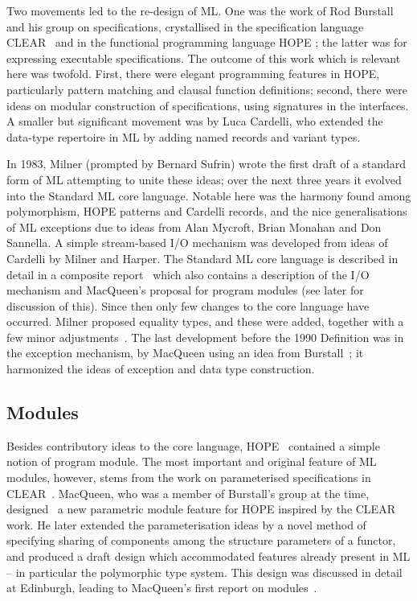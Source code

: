 Two movements led to the re-design of ML.  One was the work of Rod
Burstall and his group on specifications, crystallised in the specification
language CLEAR~\cite{BG} and in the functional programming language HOPE
\cite{BMS};  the latter was for expressing executable specifications.  The
outcome of this work which is relevant here was twofold.  First, there were
elegant programming features in HOPE, particularly pattern matching and
clausal function definitions; second, there were ideas on modular construction
of specifications, using signatures in the interfaces.  A smaller but
significant movement was by Luca Cardelli, who extended the data-type
repertoire in ML by adding named records and variant types.

In 1983, Milner (prompted by Bernard Sufrin) wrote the first draft of a
standard form of ML attempting to unite these ideas; over the next three years
it evolved into the Standard ML core language.  Notable here was the harmony
found among polymorphism, HOPE patterns and Cardelli records, and the nice
generalisations of ML exceptions due to ideas from Alan Mycroft, Brian Monahan
and Don Sannella.  A simple stream-based I/O mechanism was developed from
ideas of Cardelli by Milner and Harper.  The Standard ML core language is
described in detail in a composite report~\cite{HMM} which also contains a
description of the I/O mechanism and MacQueen's proposal for program modules
(see later for discussion of this). Since then only few changes to the core
language have occurred.  Milner proposed equality types, and these were added,
together with a few minor adjustments~\cite{Mil3}.  The
last development before the 1990 Definition was in the exception mechanism, by MacQueen using an idea
from Burstall~\cite{AMMT}; it harmonized the ideas of exception and data type
construction.

\subsection*{Modules}

Besides contributory ideas to the core language, HOPE~\cite{BMS} contained a
simple notion of program module.  The most important and original feature of
ML modules, however, stems from the work on parameterised specifications in
CLEAR~\cite{BG}.  MacQueen, who was a member of Burstall's group at the time,
designed~\cite{Mac} a new parametric module feature for HOPE inspired by the
CLEAR work.  He later extended the parameterisation ideas by a novel method of
specifying sharing of components among the structure parameters of a functor,
and produced a draft design which accommodated features already present in ML
-- in particular the polymorphic type system.  This design was discussed in
detail at Edinburgh, leading to MacQueen's first report on modules~\cite{HMM}.


